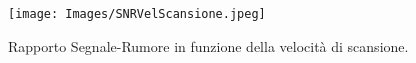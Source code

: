 \begin{figure}[h!]
    \centering
    \texttt{[image: Images/SNRVelScansione.jpeg]}
    \caption{Rapporto Segnale-Rumore in funzione della velocità di scansione.}
    \label{fig:my_label}
\end{figure}